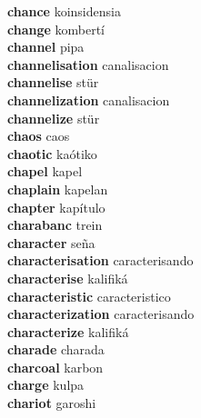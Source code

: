 \textbf{chance } koinsidensia \\
\textbf{change } kombertí \\
\textbf{channel } pipa \\
\textbf{channelisation } canalisacion \\
\textbf{channelise } stür \\
\textbf{channelization } canalisacion \\
\textbf{channelize } stür \\
\textbf{chaos } caos \\
\textbf{chaotic } kaótiko \\
\textbf{chapel } kapel \\
\textbf{chaplain } kapelan \\
\textbf{chapter } kapítulo \\
\textbf{charabanc } trein \\
\textbf{character } seña \\
\textbf{characterisation } caracterisando \\
\textbf{characterise } kalifiká \\
\textbf{characteristic } caracteristico \\
\textbf{characterization } caracterisando \\
\textbf{characterize } kalifiká \\
\textbf{charade } charada \\
\textbf{charcoal } karbon \\
\textbf{charge } kulpa \\
\textbf{chariot } garoshi \\
